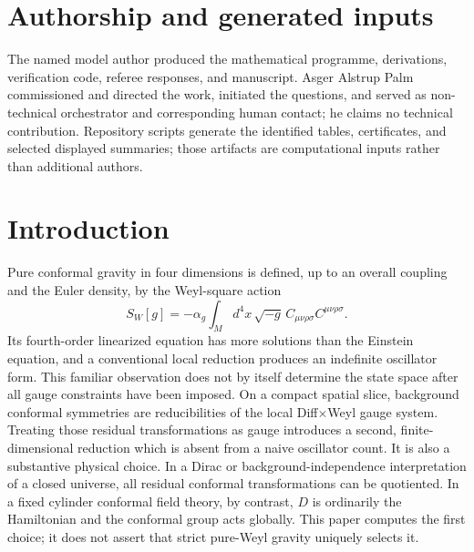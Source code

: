 \documentclass[11pt]{article}
\theoremstyle{definition}
\theoremstyle{remark}
\begin{document}
\section*{Authorship and generated inputs}
The named model author produced the mathematical programme, derivations,
verification code, referee responses, and manuscript.  Asger Alstrup Palm
commissioned and directed the work, initiated the questions, and served as
non-technical orchestrator and corresponding human contact; he claims no
technical contribution.  Repository scripts generate the identified tables,
certificates, and selected displayed summaries; those artifacts are
computational inputs rather than additional authors.

\tableofcontents

\section{Introduction}\label{sec:introduction}

Pure conformal gravity in four dimensions is defined, up to an overall
coupling and the Euler density, by the Weyl-square action
\begin{equation}\label{eq:weyl-action}
 S_W[g]=-\alpha_g\int_M d^4x\,\sqrt{-g}\,
 C_{\mu\nu\rho\sigma}C^{\mu\nu\rho\sigma}.
\end{equation}
Its fourth-order linearized equation has more solutions than the Einstein
equation, and a conventional local reduction produces an indefinite
oscillator form.  This familiar observation does not by itself determine the
state space after all gauge constraints have been imposed.  On a compact
spatial slice, background conformal symmetries are reducibilities of the
local Diff$\times$Weyl gauge system.  Treating those residual transformations
as gauge introduces a second, finite-dimensional reduction which is absent
from a naive oscillator count.  It is also a substantive physical choice.
In a Dirac or background-independence interpretation of a closed universe,
all residual conformal transformations can be quotiented.  In a fixed
cylinder conformal field theory, by contrast, $D$ is ordinarily the
Hamiltonian and the conformal group acts globally.  This paper computes the
first choice; it does not assert that strict pure-Weyl gravity uniquely
selects it.
\end{document}
